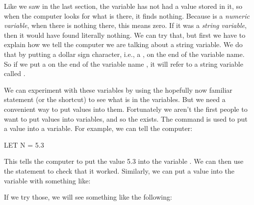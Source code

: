
Like we saw in the last section, the variable  has not had a value stored in it, so when the computer looks for
what is there, it finds nothing.  Because  is a {\em numeric variable}, when there is
nothing there, this means zero.  If it was a {\em string variable}, then it would have found literally nothing.
We can try that, but first we have to explain how we tell the computer we are talking about a string variable.  We do that by
putting a dollar sign character, i.e., a \screentextwide{\$}, on the end of the variable name. So if we put a \screentextwide{\$} on
the end of the variable name , it will refer to a string variable called .

\needspace{4cm} %
We can experiment with these variables by using the hopefully now familiar
 statement (or the  shortcut)
to see what is in the variables. But we need a convenient way to put
values into them.  Fortunately we aren't the first people to want to
put values into variables, and so the
 exists.
The  command is used to put a value into a
variable.  For example, we can tell the computer:

\begin{screenoutput}
  LET N = 5.3
\end{screenoutput}

\needspace{4cm} %
This tells the computer to put the value 5.3 into the variable
.  We can then use the 
statement to check that it worked.  Similarly, we can put a value into
the variable  with something like:


\needspace{4cm} %
If we try those, we will see something like the following:


